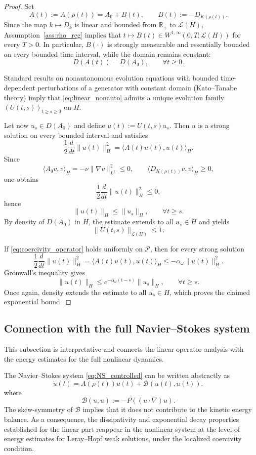 \documentclass[preprint,12pt]{elsarticle}
\begin{document}
\begin{proof}
Set
\[
A(t):=A(\rho(t))=A_0+B(t),
\qquad
B(t):=-D_{K(\rho(t))}.
\]
Since the map $k\mapsto D_k$ is linear and bounded from $\mathbb R_+$ to
$\mathcal L(H)$, Assumption~\ref{ass:rho_reg} implies that
$t\mapsto B(t)\in W^{1,\infty}(0,T;\mathcal L(H))$ for every $T>0$.
In particular, $B(\cdot)$ is strongly measurable and essentially bounded on
every bounded time interval, while the domain remains constant:
\[
D(A(t))=D(A_0),\qquad \forall t\ge0.
\]

Standard results on nonautonomous evolution equations with bounded
time-dependent perturbations of a generator with constant domain
(Kato--Tanabe theory) imply that \eqref{eq:linear_nonauto} admits a unique
evolution family $(U(t,s))_{t\ge s\ge0}$ on $H$.

Let now $u_s\in D(A_0)$ and define $u(t):=U(t,s)u_s$.
Then $u$ is a strong solution on every bounded interval and satisfies
\[
\frac12\frac{d}{dt}\|u(t)\|_H^2
=
\langle A(t)u(t),u(t)\rangle_H.
\]
Since
\[
\langle A_0v,v\rangle_H=-\nu\|\nabla v\|_{L^2}^2\le0,
\qquad
\langle D_{K(\rho(t))}v,v\rangle_H\ge0,
\]
one obtains
\[
\frac12\frac{d}{dt}\|u(t)\|_H^2\le0,
\]
hence
\[
\|u(t)\|_H\le \|u_s\|_H,\qquad \forall t\ge s.
\]
By density of $D(A_0)$ in $H$, the estimate extends to all $u_s\in H$ and
yields
\[
\|U(t,s)\|_{\mathcal L(H)}\le1.
\]

If \eqref{eq:coercivity_operator} holds uniformly on $\mathcal P$, then for
every strong solution
\[
\frac12\frac{d}{dt}\|u(t)\|_H^2
=
\langle A(t)u(t),u(t)\rangle_H
\le -\alpha_\omega\|u(t)\|_H^2.
\]
Gr\"onwall's inequality gives
\[
\|u(t)\|_H\le e^{-\alpha_\omega(t-s)}\|u_s\|_H,
\qquad \forall t\ge s.
\]
Once again, density extends the estimate to all $u_s\in H$, which proves the
claimed exponential bound.
\end{proof}

\subsection{Connection with the full Navier--Stokes system}

This subsection is interpretative and connects the linear operator analysis with
the energy estimates for the full nonlinear dynamics.

The Navier--Stokes system \eqref{eq:NS_controlled} can be written abstractly as
\[
\dot u(t)=A(\rho(t))u(t)+\mathcal B(u(t),u(t)),
\]
where
\[
\mathcal B(u,u):=-P((u\cdot\nabla)u).
\]
The skew-symmetry of $\mathcal B$ implies that it does not contribute to the
kinetic energy balance.
As a consequence, the dissipativity and exponential decay properties established
for the linear part reappear in the nonlinear system at the level of energy
estimates for Leray--Hopf weak solutions, under the localized coercivity
condition.
\end{document}
